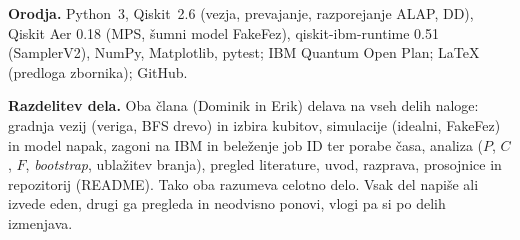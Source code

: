 \documentclass[10pt,a4paper]{article}
\begin{document}
\textbf{Orodja.} Python~3, Qiskit~2.6 (vezja, prevajanje, razporejanje ALAP, DD), Qiskit Aer 0.18 (MPS, šumni model FakeFez),
qiskit-ibm-runtime 0.51 (SamplerV2), NumPy, Matplotlib, pytest; IBM Quantum Open Plan; \LaTeX{} (predloga zbornika); GitHub.\par

\textbf{Razdelitev dela.} Oba člana (Dominik in Erik) delava na vseh delih naloge: gradnja vezij (veriga, BFS drevo) in izbira
kubitov, simulacije (idealni, FakeFez) in model napak, zagoni na IBM in beleženje job ID ter porabe časa, analiza ($P$, $C$, $F$,
\emph{bootstrap}, ublažitev branja), pregled literature, uvod, razprava, prosojnice in repozitorij (README). Tako oba razumeva celotno delo.
Vsak del napiše ali izvede eden, drugi ga pregleda in neodvisno ponovi, vlogi pa si po delih izmenjava.
\end{document}
